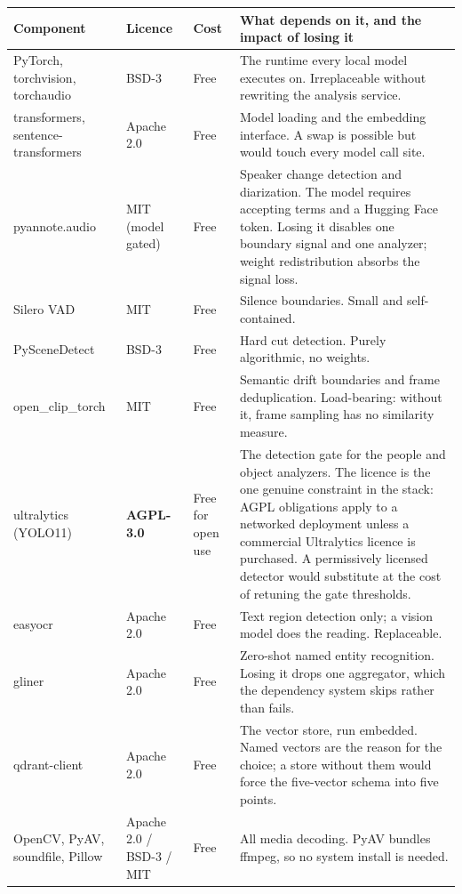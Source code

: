 \documentclass[11pt,a4paper]{article}
\begin{document}
\begin{table}[htbp]
\centering
\small
\begin{tabularx}{\textwidth}{@{}L{2.9cm}L{1.9cm}L{1.3cm}X@{}}
\toprule
\textbf{Component} & \textbf{Licence} & \textbf{Cost} & \textbf{What depends on it, and the impact of losing it} \\
\midrule
PyTorch, torchvision, torchaudio & BSD-3 & Free & The runtime every local model executes on. Irreplaceable without rewriting the analysis service. \\
transformers, sentence-transformers & Apache 2.0 & Free & Model loading and the embedding interface. A swap is possible but would touch every model call site. \\
pyannote.audio & MIT (model gated) & Free & Speaker change detection and diarization. The model requires accepting terms and a Hugging Face token. Losing it disables one boundary signal and one analyzer; weight redistribution absorbs the signal loss. \\
Silero VAD & MIT & Free & Silence boundaries. Small and self-contained. \\
PySceneDetect & BSD-3 & Free & Hard cut detection. Purely algorithmic, no weights. \\
open\_clip\_torch & MIT & Free & Semantic drift boundaries and frame deduplication. Load-bearing: without it, frame sampling has no similarity measure. \\
ultralytics (YOLO11) & \textbf{AGPL-3.0} & Free for open use & The detection gate for the people and object analyzers. The licence is the one genuine constraint in the stack: AGPL obligations apply to a networked deployment unless a commercial Ultralytics licence is purchased. A permissively licensed detector would substitute at the cost of retuning the gate thresholds. \\
easyocr & Apache 2.0 & Free & Text region detection only; a vision model does the reading. Replaceable. \\
gliner & Apache 2.0 & Free & Zero-shot named entity recognition. Losing it drops one aggregator, which the dependency system skips rather than fails. \\
qdrant-client & Apache 2.0 & Free & The vector store, run embedded. Named vectors are the reason for the choice; a store without them would force the five-vector schema into five points. \\
OpenCV, PyAV, soundfile, Pillow & Apache 2.0 / BSD-3 / MIT & Free & All media decoding. PyAV bundles ffmpeg, so no system install is needed. \\

\end{tabularx}
\end{table}
\end{document}
